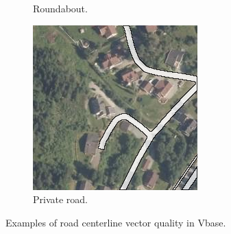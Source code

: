\begin{figure}[h]
\begin{subfigure}{0.31\textwidth}
\caption{Roundabout.} \label{fig:norwegian_roads_roundabout_vbase}
\end{subfigure}
\hspace*{\fill} %
\begin{subfigure}{0.31\textwidth}
\includegraphics[width=\linewidth]{figs/datasets/nor_examples/1157_missing_vbase.png}
\caption{Private road.} \label{fig:norwegian_roads_missing_vbase}
\end{subfigure}
\hspace*{\fill} %
\caption[Road centerline vector quality of Vbase]{Examples of road centerline vector quality in Vbase.} \label{fig:norwegian_roads_examples_vbase}
\end{figure}

